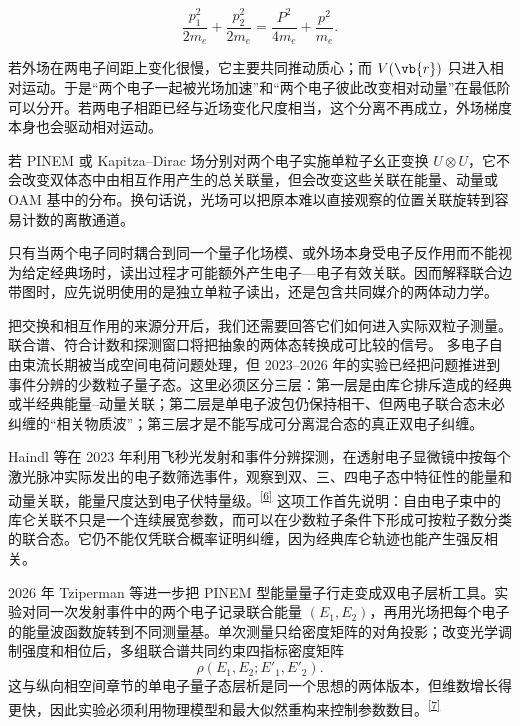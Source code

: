 \begin{equation}
\frac{p_1^2}{2m_e}+\frac{p_2^2}{2m_e}=\frac{P^2}{4m_e}+\frac{p^2}{m_e}.
\label{eq:ch06-4}
\end{equation}

若外场在两电子间距上变化很慢，它主要共同推动质心；而 $V(\vb{r})$ 只进入相对运动。于是“两个电子一起被光场加速”和“两个电子彼此改变相对动量”在最低阶可以分开。若两电子相距已经与近场变化尺度相当，这个分离不再成立，外场梯度本身也会驱动相对运动。

若 PINEM 或 Kapitza--Dirac 场分别对两个电子实施单粒子幺正变换 $U\otimes U$，它不会改变双体态中由相互作用产生的总关联量，但会改变这些关联在能量、动量或 OAM 基中的分布。换句话说，光场可以把原本难以直接观察的位置关联旋转到容易计数的离散通道。

只有当两个电子同时耦合到同一个量子化场模、或外场本身受电子反作用而不能视为给定经典场时，读出过程才可能额外产生电子—电子有效关联。因而解释联合边带图时，应先说明使用的是独立单粒子读出，还是包含共同媒介的两体动力学。

把交换和相互作用的来源分开后，我们还需要回答它们如何进入实际双粒子测量。联合谱、符合计数和探测窗口将把抽象的两体态转换成可比较的信号。
多电子自由束流长期被当成空间电荷问题处理，但 2023--2026 年的实验已经把问题推进到事件分辨的少数粒子量子态。这里必须区分三层：第一层是由库仑排斥造成的经典或半经典能量--动量关联；第二层是单电子波包仍保持相干、但两电子联合态未必纠缠的“相关物质波”；第三层才是不能写成可分离混合态的真正双电子纠缠。

Haindl 等在 2023 年利用飞秒光发射和事件分辨探测，在透射电子显微镜中按每个激光脉冲实际发出的电子数筛选事件，观察到双、三、四电子态中特征性的能量和动量关联，能量尺度达到电子伏特量级。\textsuperscript{\hyperref[ch06-ref2]{[6]}} 这项工作首先说明：自由电子束中的库仑关联不只是一个连续展宽参数，而可以在少数粒子条件下形成可按粒子数分类的联合态。它仍不能仅凭联合概率证明纠缠，因为经典库仑轨迹也能产生强反相关。

2026 年 Tziperman 等进一步把 PINEM 型能量量子行走变成双电子层析工具。实验对同一次发射事件中的两个电子记录联合能量 $(E_1,E_2)$，再用光场把每个电子的能量波函数旋转到不同测量基。单次测量只给密度矩阵的对角投影；改变光学调制强度和相位后，多组联合谱共同约束四指标密度矩阵
\begin{equation}
\rho(E_1,E_2;E'_1,E'_2).
\label{eq:ch06-twoelectron-rho}
\end{equation}
这与纵向相空间章节的单电子量子态层析是同一个思想的两体版本，但维数增长得更快，因此实验必须利用物理模型和最大似然重构来控制参数数目。\textsuperscript{\hyperref[ch06-ref3]{[7]}}


